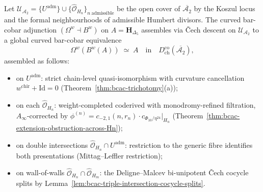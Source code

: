 \begin{theorem}
\label{thm:bcac-global-cech-descent}
\ClaimStatusConditional
{}
Let
$\mathcal{U}_{\mathcal{A}_2}
=\{U^{\mathrm{adm}}\}\cup\{\widehat{\mathcal{O}}_{H_n}\}_{n\ \text{admissible}}$
be the open cover of $\overline{\mathcal{A}_2}$ by the Koszul
locus and the formal neighbourhoods of admissible Humbert
divisors. The curved bar-cobar adjunction
$(\Omega^w\dashv B^w)$ on $A=\mathbf{H}_{\Delta_5}$ assembles via
\v Cech descent on $\mathcal{U}_{\mathcal{A}_2}$ to a global
curved bar-cobar equivalence
\[
 \Omega^w(B^w(A))
 \;\simeq\;
 A
 \quad\text{in}\quad
 D^{\mathrm{co}}_{\mathrm{ch}}(\overline{\mathcal{A}_2}),
\]
assembled as follows:
\begin{itemize}
\item on $U^{\mathrm{adm}}$: strict chain-level quasi-isomorphism
with curvature cancellation $w^{\mathrm{chir}}+\mathrm{Id}=0$
(Theorem~\ref{thm:bcac-trichotomy}(a));
\item on each $\widehat{\mathcal{O}}_{H_n}$: weight-completed
coderived with monodromy-refined filtration, $A_\infty$-corrected
by $\phi^{(n)}=c_{-2,1}(n,r_n)\cdot
c_{\Phi_{10}/\eta^{24}}|_{H_n}$
(Theorem~\ref{thm:bcac-extension-obstruction-across-Hn});
\item on double intersections
$\widehat{\mathcal{O}}_{H_n}\cap U^{\mathrm{adm}}$: restriction to
the generic fibre identifies both presentations
(Mittag--Leffler restriction);
\item on wall-of-walls
$\widehat{\mathcal{O}}_{H_n}\cap\widehat{\mathcal{O}}_{H_m}$: the
Deligne--Malcev bi-unipotent \v Cech cocycle splits by
Lemma~\ref{lem:bcac-triple-intersection-cocycle-splits}.
\end{itemize}
\end{theorem}

